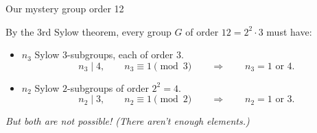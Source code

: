 \documentclass[8pt, handout]{beamer}
\newcommand{\Pause}{}      %
\begin{document}
\begin{frame}{Our mystery group order 12} %
  
  By the 3rd Sylow theorem, every group $G$ of order $12=2^2\cdot 3$
  must have:
  \begin{itemize}
  \item $n_3$ Sylow $3$-subgroups, each of order $3$. \vspace{-1mm}
    \[
    n_3\mid 4,\qquad n_3\equiv 1\pmod{3}\qquad\Longrightarrow\qquad
    \text{$n_3=1$ or $4$}.
    \]
  \item $n_2$ Sylow $2$-subgroups of order $2^2=4$. \vspace{-1mm}
    \[
    n_2\mid 3,\qquad n_2\equiv 1\pmod{2}\qquad\Longrightarrow\qquad
    \text{$n_2=1$ or $3$}.
    \]
  \end{itemize}
  \emph{But both are not possible! (There aren't enough elements.)}
  \vspace{-10mm}
  

\end{frame}
\end{document}
